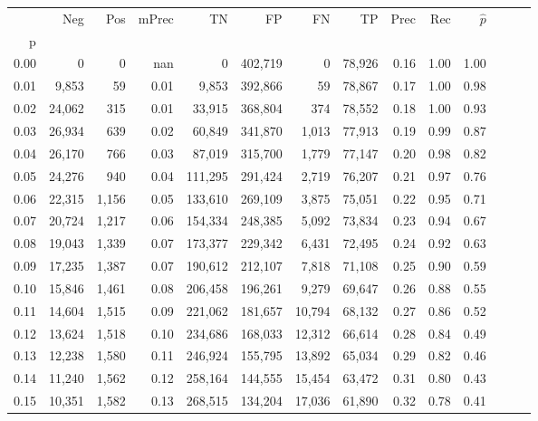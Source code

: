 \begin{tabular}{rrrrrrrrrrrrrr}
\toprule
{} &     Neg &    Pos & mPrec &       TN &       FP &      FN &      TP &  Prec &   Rec & $\hat{p}$ \\
p    &         &        &       &          &          &         &         &       &       &           \\
\midrule
0.00 &       0 &      0 &   nan &        0 &  402,719 &       0 &  78,926 &  0.16 &  1.00 &      1.00 \\
0.01 &   9,853 &     59 &  0.01 &    9,853 &  392,866 &      59 &  78,867 &  0.17 &  1.00 &      0.98 \\
0.02 &  24,062 &    315 &  0.01 &   33,915 &  368,804 &     374 &  78,552 &  0.18 &  1.00 &      0.93 \\
0.03 &  26,934 &    639 &  0.02 &   60,849 &  341,870 &   1,013 &  77,913 &  0.19 &  0.99 &      0.87 \\
0.04 &  26,170 &    766 &  0.03 &   87,019 &  315,700 &   1,779 &  77,147 &  0.20 &  0.98 &      0.82 \\
0.05 &  24,276 &    940 &  0.04 &  111,295 &  291,424 &   2,719 &  76,207 &  0.21 &  0.97 &      0.76 \\
0.06 &  22,315 &  1,156 &  0.05 &  133,610 &  269,109 &   3,875 &  75,051 &  0.22 &  0.95 &      0.71 \\
0.07 &  20,724 &  1,217 &  0.06 &  154,334 &  248,385 &   5,092 &  73,834 &  0.23 &  0.94 &      0.67 \\
0.08 &  19,043 &  1,339 &  0.07 &  173,377 &  229,342 &   6,431 &  72,495 &  0.24 &  0.92 &      0.63 \\
0.09 &  17,235 &  1,387 &  0.07 &  190,612 &  212,107 &   7,818 &  71,108 &  0.25 &  0.90 &      0.59 \\
0.10 &  15,846 &  1,461 &  0.08 &  206,458 &  196,261 &   9,279 &  69,647 &  0.26 &  0.88 &      0.55 \\
0.11 &  14,604 &  1,515 &  0.09 &  221,062 &  181,657 &  10,794 &  68,132 &  0.27 &  0.86 &      0.52 \\
0.12 &  13,624 &  1,518 &  0.10 &  234,686 &  168,033 &  12,312 &  66,614 &  0.28 &  0.84 &      0.49 \\
0.13 &  12,238 &  1,580 &  0.11 &  246,924 &  155,795 &  13,892 &  65,034 &  0.29 &  0.82 &      0.46 \\
0.14 &  11,240 &  1,562 &  0.12 &  258,164 &  144,555 &  15,454 &  63,472 &  0.31 &  0.80 &      0.43 \\
0.15 &  10,351 &  1,582 &  0.13 &  268,515 &  134,204 &  17,036 &  61,890 &  0.32 &  0.78 &      0.41 \\

\end{tabular}
